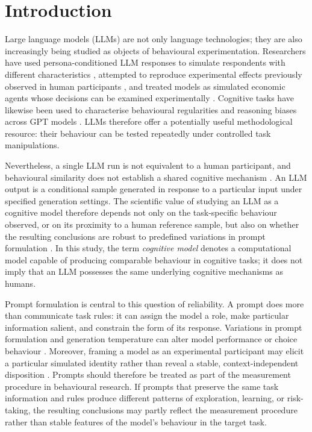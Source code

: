 \section{Introduction}

Large language models (LLMs) are not only language technologies; they are also increasingly being studied as objects of behavioural experimentation. Researchers have used persona-conditioned LLM responses to simulate respondents with different characteristics \cite{Argyle2023OutOfOneMany}, attempted to reproduce experimental effects previously observed in human participants \cite{Aher2023SimulateHumans}, and treated models as simulated economic agents whose decisions can be examined experimentally \cite{Horton2023HomoSilicus}. Cognitive tasks have likewise been used to characterise behavioural regularities and reasoning biases across GPT models \cite{Binz2023CognitivePsychologyGPT3,Hagendorff2023HumanLikeBiases}. LLMs therefore offer a potentially useful methodological resource: their behaviour can be tested repeatedly under controlled task manipulations.

Nevertheless, a single LLM run is not equivalent to a human participant, and behavioural similarity does not establish a shared cognitive mechanism \cite{Shanahan2023RolePlay}. An LLM output is a conditional sample generated in response to a particular input under specified generation settings. The scientific value of studying an LLM as a cognitive model therefore depends not only on the task-specific behaviour observed, or on its proximity to a human reference sample, but also on whether the resulting conclusions are robust to predefined variations in prompt formulation \cite{Loya2023PromptSensitivityDecision}. In this study, the term \emph{cognitive model} denotes a computational model capable of producing comparable behaviour in cognitive tasks; it does not imply that an LLM possesses the same underlying cognitive mechanisms as humans.

Prompt formulation is central to this question of reliability. A prompt does more than communicate task rules: it can assign the model a role, make particular information salient, and constrain the form of its response. Variations in prompt formulation and generation temperature can alter model performance or choice behaviour \cite{Loya2023PromptSensitivityDecision}. Moreover, framing a model as an experimental participant may elicit a particular simulated identity rather than reveal a stable, context-independent disposition \cite{Shanahan2023RolePlay}. Prompts should therefore be treated as part of the measurement procedure in behavioural research. If prompts that preserve the same task information and rules produce different patterns of exploration, learning, or risk-taking, the resulting conclusions may partly reflect the measurement procedure rather than stable features of the model's behaviour in the target task.


